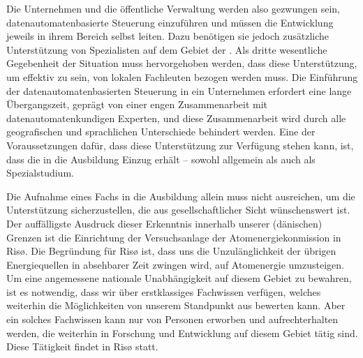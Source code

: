 {Die Unternehmen und die öffentliche Verwaltung werden also gezwungen sein, datenautomatenbasierte Steuerung einzuführen und müssen die Entwicklung jeweils in ihrem Bereich selbst leiten. Dazu benötigen sie jedoch zusätzliche Unterstützung von Spezialisten auf dem Gebiet der . Als dritte wesentliche Gegebenheit der Situation muss hervorgehoben werden, dass diese Unterstützung, um effektiv zu sein, von lokalen Fachleuten bezogen werden muss. Die Einführung der datenautomatenbasierten Steuerung in ein Unternehmen erfordert eine lange Übergangszeit, geprägt von einer engen Zusammenarbeit mit datenautomatenkundigen Experten, und diese Zusammenarbeit wird durch alle geografischen und sprachlichen Unterschiede behindert werden. Eine der Voraussetzungen dafür, dass diese Unterstützung zur Verfügung stehen kann, ist, dass die  in die Ausbildung Einzug erhält -- sowohl allgemein als auch als Spezialstudium.

Die Aufnahme eines Fachs in die Ausbildung allein muss nicht ausreichen, um die Unterstützung sicherzustellen, die aus gesellschaftlicher Sicht wünschenswert ist. Der auffälligste Ausdruck dieser Erkenntnis innerhalb unserer (dänischen) Grenzen ist die Einrichtung der Versuchsanlage der Atomenergiekonmission in Risø. Die Begründung für Risø ist, dass uns die Unzulänglichkeit der übrigen Energiequellen in absehbarer Zeit zwingen wird, auf Atomenergie umzusteigen. Um eine angemessene nationale Unabhängigkeit auf diesem Gebiet zu bewahren, ist es notwendig, dass wir über erstklassiges Fachwissen verfügen, welches weiterhin die Möglichkeiten von unserem Standpunkt aus bewerten kann. Aber ein solches Fachwissen kann nur von Personen erworben und aufrechterhalten werden, die weiterhin in Forschung und Entwicklung auf diesem Gebiet tätig sind. Diese Tätigkeit findet in Risø statt.
}


